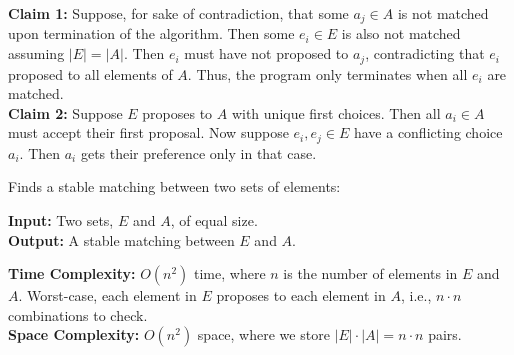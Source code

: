 \begin{Proof}

    \textbf{Claim 1:} Suppose, for sake of contradiction, that some $a_j \in A$ is not matched upon termination of the algorithm.
    Then some $e_i \in E$ is also not matched assuming $|E| = |A|$. Then $e_i$ must have not proposed to $a_j$, contradicting
    that $e_i$ proposed to all elements of $A$. Thus, the program only terminates when all $e_i$ are matched.\\

    \noindent
    \textbf{Claim 2:} Suppose $E$ proposes to $A$ with unique first choices. Then all $a_i\in A$ must accept their first proposal.
    Now suppose $e_i,e_j\in E$ have a conflicting choice $a_i$. Then $a_i$ gets their preference only in that case. 
    
\end{Proof}
\begin{Func}
    Finds a stable matching between two sets of elements:

    \vspace{.5em}
    \noindent
    \textbf{Input:} Two sets, $E$ and $A$, of equal size.\\
    \textbf{Output:} A stable matching between $E$ and $A$.\\
    \begin{algorithm}[H]
        \SetAlgoLined
    \end{algorithm}

    \noindent
    \textbf{Time Complexity:} $O(n^2)$ time, where $n$ is the number of elements in $E$ and $A$. Worst-case,
    each element in $E$ proposes to each element in $A$, i.e., $n\cdot n$ combinations to check.\\

    \noindent
    \textbf{Space Complexity:} $O(n^2)$ space, where we store $|E|\cdot|A|=n\cdot n$ pairs.
\end{Func}

